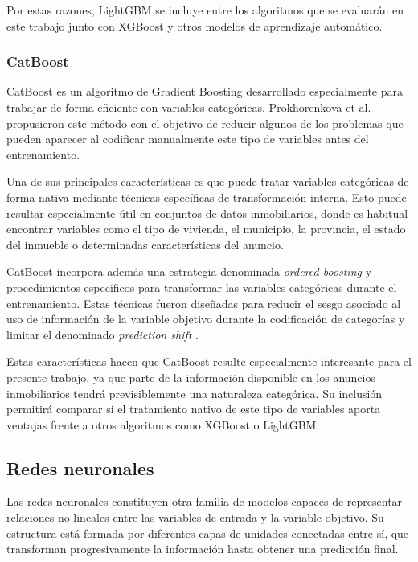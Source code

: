 \documentclass[IB]{TFUOC}%
\begin{document}
Por estas razones, LightGBM se incluye entre los algoritmos que se evaluarán en este trabajo junto con XGBoost y otros modelos de aprendizaje automático.

\subsubsection{CatBoost}

CatBoost es un algoritmo de Gradient Boosting desarrollado especialmente para trabajar de forma eficiente con variables categóricas. Prokhorenkova et al. \cite{prokhorenkova2018catboost} propusieron este método con el objetivo de reducir algunos de los problemas que pueden aparecer al codificar manualmente este tipo de variables antes del entrenamiento.

Una de sus principales características es que puede tratar variables categóricas de forma nativa mediante técnicas específicas de transformación interna. Esto puede resultar especialmente útil en conjuntos de datos inmobiliarios, donde es habitual encontrar variables como el tipo de vivienda, el municipio, la provincia, el estado del inmueble o determinadas características del anuncio.

CatBoost incorpora además una estrategia denominada \textit{ordered boosting} y procedimientos específicos para transformar las variables categóricas durante el entrenamiento. Estas técnicas fueron diseñadas para reducir el sesgo asociado al uso de información de la variable objetivo durante la codificación de categorías y limitar el denominado \textit{prediction shift} \cite{prokhorenkova2018catboost}.

Estas características hacen que CatBoost resulte especialmente interesante para el presente trabajo, ya que parte de la información disponible en los anuncios inmobiliarios tendrá previsiblemente una naturaleza categórica. Su inclusión permitirá comparar si el tratamiento nativo de este tipo de variables aporta ventajas frente a otros algoritmos como XGBoost o LightGBM.

\subsection{Redes neuronales}

Las redes neuronales constituyen otra familia de modelos capaces de representar relaciones no lineales entre las variables de entrada y la variable objetivo. Su estructura está formada por diferentes capas de unidades conectadas entre sí, que transforman progresivamente la información hasta obtener una predicción final.
\end{document}

